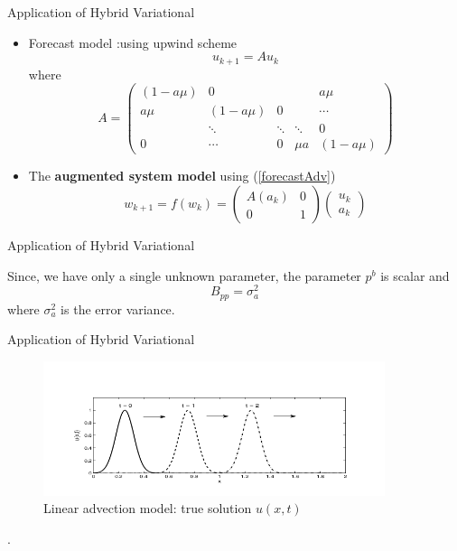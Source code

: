 \documentclass{beamer}
\begin{document}
\begin{frame}{Application of Hybrid Variational}
\begin{itemize}
    \item Forecast model :using upwind scheme
            \begin{equation}
            u_{k+1} = A  u_k 
            \label{forecastAdv}
            \end{equation}
            where 
            \[A = 
            \begin{pmatrix}
            (1-a\mu)  & 0&   &  &a\mu \\
             a\mu  & (1-a\mu) & 0&  &\cdots \\
             &\ddots & \ddots &\ddots & 0 \\
             0 & \cdots & 0 & \mu a & (1-a\mu)
            \end{pmatrix}
            \]
    \item The \textbf{augmented system model} using (\ref{forecastAdv})
            \begin{equation}
            w_{k+1} = f(w_k) = 
            \begin{pmatrix}
            A(a_k) & 0\\
            0 & 1
            \end{pmatrix} 
            \begin{pmatrix}
            u_k\\
            a_k
            \end{pmatrix} 
            \label{MatrixA}
            \end{equation}
\end{itemize}
\end{frame}
\begin{frame}{Application of Hybrid Variational}
        \item Since, we have only a single unknown parameter, the parameter $p^b$ is scalar and 
    \begin{equation}
        B_{pp} = \sigma_a^2
    \label{Bpp}
    \end{equation}
    where $\sigma_a^2$ is the error variance.
\end{frame}
\begin{frame}{Application of Hybrid Variational}
\begin{figure}[h]
    \begin{center}
    \includegraphics[width=10cm]{./Image/trueSolAdvection.png}
    \caption{Linear advection model: true solution $u(x, t)$}
    \label{trueSol}
    \end{center}
\end{figure}.
\end{frame}
\end{document}
